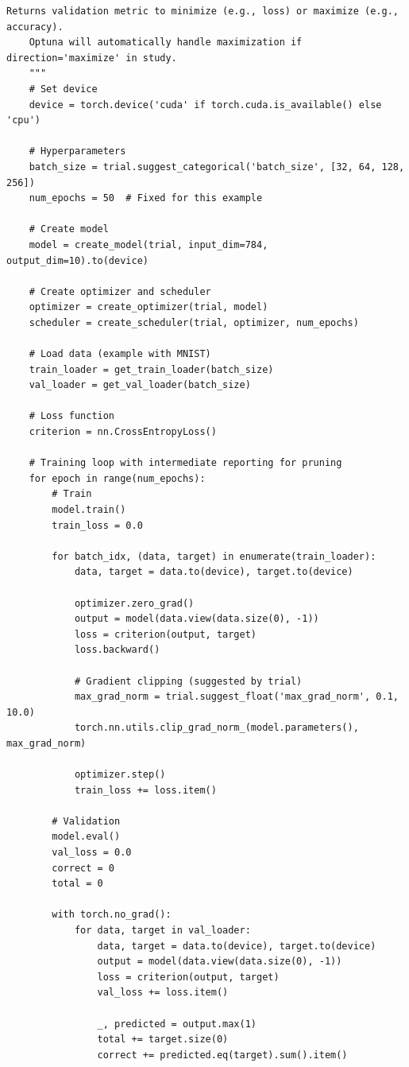 \begin{lstlisting}[style=python, caption=Advanced Optuna hyperparameter optimization]
    Returns validation metric to minimize (e.g., loss) or maximize (e.g., accuracy).
    Optuna will automatically handle maximization if direction='maximize' in study.
    """
    # Set device
    device = torch.device('cuda' if torch.cuda.is_available() else 'cpu')

    # Hyperparameters
    batch_size = trial.suggest_categorical('batch_size', [32, 64, 128, 256])
    num_epochs = 50  # Fixed for this example

    # Create model
    model = create_model(trial, input_dim=784, output_dim=10).to(device)

    # Create optimizer and scheduler
    optimizer = create_optimizer(trial, model)
    scheduler = create_scheduler(trial, optimizer, num_epochs)

    # Load data (example with MNIST)
    train_loader = get_train_loader(batch_size)
    val_loader = get_val_loader(batch_size)

    # Loss function
    criterion = nn.CrossEntropyLoss()

    # Training loop with intermediate reporting for pruning
    for epoch in range(num_epochs):
        # Train
        model.train()
        train_loss = 0.0

        for batch_idx, (data, target) in enumerate(train_loader):
            data, target = data.to(device), target.to(device)

            optimizer.zero_grad()
            output = model(data.view(data.size(0), -1))
            loss = criterion(output, target)
            loss.backward()

            # Gradient clipping (suggested by trial)
            max_grad_norm = trial.suggest_float('max_grad_norm', 0.1, 10.0)
            torch.nn.utils.clip_grad_norm_(model.parameters(), max_grad_norm)

            optimizer.step()
            train_loss += loss.item()

        # Validation
        model.eval()
        val_loss = 0.0
        correct = 0
        total = 0

        with torch.no_grad():
            for data, target in val_loader:
                data, target = data.to(device), target.to(device)
                output = model(data.view(data.size(0), -1))
                loss = criterion(output, target)
                val_loss += loss.item()

                _, predicted = output.max(1)
                total += target.size(0)
                correct += predicted.eq(target).sum().item()


\end{lstlisting}
